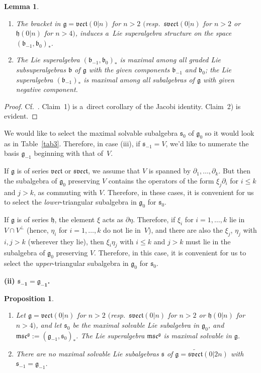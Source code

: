 \documentclass[10pt,a4paper]{amsart}
\newcommand{\del}{\partial}
\newcommand {\fb} {{\mathfrak{b}}}
\newcommand {\fc} {{\mathfrak{c}}}
\newcommand {\fg} {{\mathfrak{g}}} %
\newcommand {\fh} {{\mathfrak{h}}}
\newcommand {\fm} {{\mathfrak{m}}}
\newcommand {\fs} {{\mathfrak{s}}}
\newcommand {\fsvect} {{\mathfrak{svect}}}
\newcommand {\fvect} {{\mathfrak{vect}}} %
\newcommand {\<} [2] {{\left.\vphantom{#2}\right.^{#1\!}\!{#2}}}
\numberwithin{equation}{section}
\newtheorem{Lemma}[Theorem]{Lemma}
\newtheorem{Proposition}[Theorem]{Proposition}
\begin{document}
\begin{Lemma}\label{L3} \quad\samepage
\begin{enumerate}\itemsep=0pt
\item[$1)$] The bracket in $\fg=\fvect(0|n)$ for $n> 2$ $($resp.\ $\fsvect(0|n)$ for $n>2$ or $\fh(0|n)$ for $n> 4)$, induces a~Lie superalgebra structure on the space $(\fb_{-1}, \fb_{0})_*$.

\item[$2)$] The Lie superalgebra $(\fb_{-1}, \fb_{0})_*$
is maximal among all graded Lie subsuperalgebras $\fb$ of $\fg$ with the given components $\fb_{-1}$ and $\fb_{0}$; the Lie superalgebra $(\fb_{-1})_*$ is maximal among all subalgebras of $\fg$ with given negative component.
\end{enumerate}
 \end{Lemma}

\begin{proof} Cf.~\cite{BLM}. Claim~1) is a~direct corollary of the Jacobi identity. Claim~2) is evident. \end{proof}

We would like to select the maximal solvable subalgebra $\fs_0$ of $\fg_0$ so it would
look as in Table~\ref{tab3}. Therefore, in case (iii), if $\fs_{-1}= V$, we'd like to numerate the basis $\fg_{-1}$ beginning with that of~$V$.

If $\fg$ is of series $\fvect$ or $\fsvect$, we assume that $V$ is spanned by $\del_1, \dots , \del_k$. But then the subalgebra of $\fg_0$ preserving $V$ contains the operators of the form $\xi_j\del_i$ for $i\le k$ and $j>k$, as commuting with $V$. Therefore, in these cases, it is convenient for us to select the \textit{lower}-triangular subalgebra in $\fg_0$ for $\fs_0$.

If $\fg$ is of series $\fh$, the element $\xi$ acts as $\del \eta$. Therefore, if $\xi_i$ for $i=1,\dots ,k$ lie in $V\cap V^\perp$ (hence, $\eta_i$ for $i=1,\dots ,k$ do not lie in~$V$), and there are also the $\xi_j$, $\eta_j$ with $i, j >k$ (wherever they lie), then $\xi_i\eta_j$ with $i\le k$ and $j>k$ must lie in the subalgebra of $\fg_0$ preserving $V$. Therefore, in this case, it is convenient for us to select the \textit{upper}-triangular subalgebra in $\fg_0$ for $\fs_0$.

{\bf (ii) $\boldsymbol{\fs_{-1}=\fg_{-1}}$.}


\begin{Proposition}\label{P2}\quad
\begin{enumerate}\itemsep=0pt
\item[$1)$] Let $\fg=\fvect(0|n)$ for $n> 2$ $($resp.\ $\fsvect(0|n)$ for $n>2$ or $\fh(0|n)$ for $n> 4)$, and let $\fs_0$ be the maximal solvable Lie subalgebra in $\fg_0$, and $\fm\fs\fc^\fg:=(\fg_{-1}, \fs_0)_*$.
The Lie superalgebra $\fm\fs\fc^\fg$ is maximal solvable in $\fg$.
\item[$2)$] There are no maximal solvable Lie subalgebras $\fs$ of $\fg=\widetilde \fsvect(0|2n)$ with $\fs_{-1}=\fg_{-1}$.
\end{enumerate}
\end{Proposition}
\end{document}
